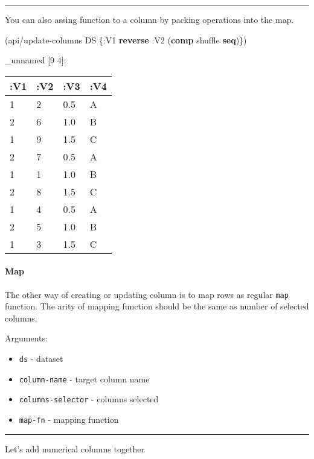 \documentclass[]{article}
\newenvironment{Shaded}{\begin{snugshade}}{\end{snugshade}}
\newcommand{\AttributeTok}[1]{\textcolor[rgb]{0.77,0.63,0.00}{#1}}
\newcommand{\KeywordTok}[1]{\textcolor[rgb]{0.13,0.29,0.53}{\textbf{#1}}}
\newcommand{\NormalTok}[1]{#1}
\providecommand{\tightlist}{%
  \setlength{\itemsep}{0pt}\setlength{\parskip}{0pt}}
\let\oldparagraph\paragraph
\renewcommand{\paragraph}[1]{\oldparagraph{#1}\mbox{}}
\begin{document}
\begin{center}\rule{0.5\linewidth}{0.5pt}\end{center}

You can also assing function to a column by packing operations into the
map.

\begin{Shaded}
\begin{Highlighting}[]
\NormalTok{(api/update-columns DS \{}\AttributeTok{:V1} \KeywordTok{reverse}
                        \AttributeTok{:V2}\NormalTok{ (}\KeywordTok{comp}\NormalTok{ shuffle }\KeywordTok{seq}\NormalTok{)\})}
\end{Highlighting}
\end{Shaded}

\_unnamed {[}9 4{]}:

\begin{longtable}[]{@{}llll@{}}
\toprule
:V1 & :V2 & :V3 & :V4\tabularnewline
\midrule
\endhead
1 & 2 & 0.5 & A\tabularnewline
2 & 6 & 1.0 & B\tabularnewline
1 & 9 & 1.5 & C\tabularnewline
2 & 7 & 0.5 & A\tabularnewline
1 & 1 & 1.0 & B\tabularnewline
2 & 8 & 1.5 & C\tabularnewline
1 & 4 & 0.5 & A\tabularnewline
2 & 5 & 1.0 & B\tabularnewline
1 & 3 & 1.5 & C\tabularnewline
\bottomrule
\end{longtable}

\hypertarget{map}{%
\paragraph{Map}\label{map}}

The other way of creating or updating column is to map rows as regular
\texttt{map} function. The arity of mapping function should be the same
as number of selected columns.

Arguments:

\begin{itemize}
\tightlist
\item
  \texttt{ds} - dataset
\item
  \texttt{column-name} - target column name
\item
  \texttt{columns-selector} - columns selected
\item
  \texttt{map-fn} - mapping function
\end{itemize}

\begin{center}\rule{0.5\linewidth}{0.5pt}\end{center}

Let's add numerical columns together
\end{document}
